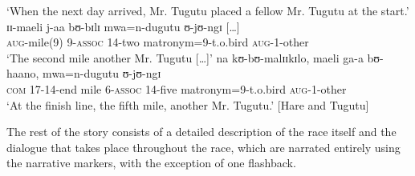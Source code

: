 \begin{exe}
\begin{xlist}
\glt \lq When the next day arrived, Mr. Tugutu placed a fellow Mr. Tugutu at the start.'
\ex\label{exHareTugutuPlacingSentence6} \gll ɪɪ-maeli j-aa bʊ-bɪlɪ mwa=n-dugutu ʊ-jʊ-ngɪ \textup{[\ldots]}\\
\textsc{aug}-mile(9) 9-\textsc{assoc} 14-two matronym=9-t.o.bird \textsc{aug}-1-other\\
\glt \lq The second mile another Mr. Tugutu [\ldots]'
\ex\label{exHareTugutuPlacingSentence7}\gll na kʊ-bʊ-malɪɪkɪlo, maeli ga-a bʊ-haano, mwa=n-dugutu ʊ-jʊ-ngɪ\\
\textsc{com} 17-14-end mile 6-\textsc{assoc} 14-five matronym=9-t.o.bird \textsc{aug}-1-other\\
\glt \lq At the finish line, the fifth mile, another Mr. Tugutu.' [Hare and Tugutu]%
\end{xlist}
\end{exe}

\largerpage
The rest of the story consists of a detailed description of the race itself and the dialogue that takes place throughout the race, which are narrated entirely using the narrative markers, with the exception of one flashback.

